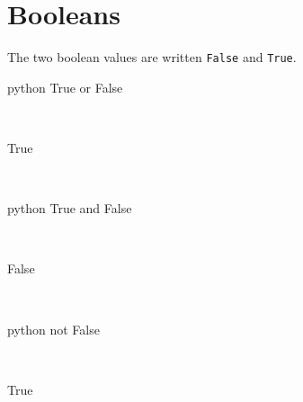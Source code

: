\documentclass[aspectratio=1610,slidestop]{beamer}
\begin{document}
\section{Booleans}

\begin{pframe}
  The two boolean values are written \texttt{False} and
  \texttt{True}.
 \begin{ipython}
  \begin{pythonin}{python}
True or False
  \end{pythonin}
  \\
  \begin{pythonout}
True
  \end{pythonout}
  \\

  \begin{pythonin}{python}
True and False
  \end{pythonin}
  \\
  \begin{pythonout}
False
  \end{pythonout}
  \\

  \begin{pythonin}{python}
not False
  \end{pythonin}
  \\
  \begin{pythonout}
True
  \end{pythonout}
 \end{ipython}
\end{pframe}
\end{document}
